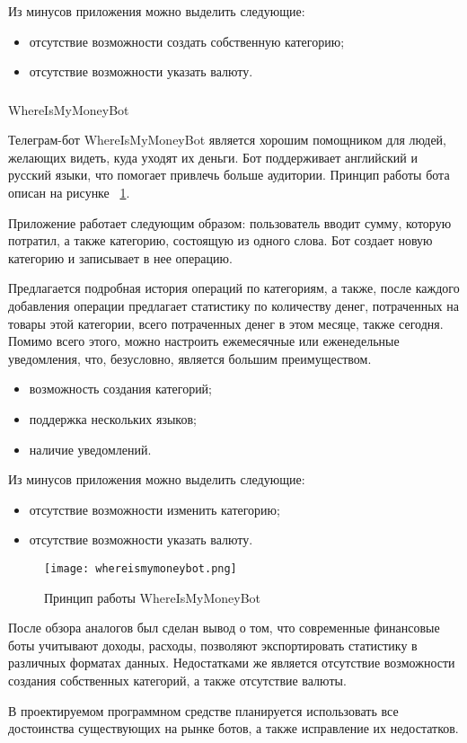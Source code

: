 Из минусов приложения можно выделить следующие:

\begin{itemize}
	\item отсутствие возможности создать собственную категорию;
	\item отсутствие возможности указать валюту.
\end{itemize}

\subsubsection{} WhereIsMyMoneyBot
\label{sec:analysis:analogues:whereismymoney}

Телеграм-бот WhereIsMyMoneyBot является хорошим помощником \linebreak для людей, желающих видеть, куда уходят их деньги. Бот поддерживает английский и русский языки, что помогает привлечь больше аудитории. Принцип работы бота описан на рисунке ~\ref{fig:analysis:analogues:whereismymoneybot}.

Приложение работает следующим образом: пользователь вводит сумму, которую потратил, а также категорию, состоящую из одного слова. Бот создает новую категорию и записывает в нее операцию.

Предлагается подробная история операций по категориям, а также, после каждого добавления операции предлагает статистику по количеству денег, потраченных на товары этой категории, всего потраченных денег в этом месяце, также сегодня. Помимо всего этого, можно настроить ежемесячные или еженедельные уведомления, что, безусловно, является большим преимуществом.

\begin{itemize}
	\item возможность создания категорий;
	\item поддержка нескольких языков;
	\item наличие уведомлений.
\end{itemize}

Из минусов приложения можно выделить следующие:

\begin{itemize}
	\item отсутствие возможности изменить категорию;
	\item отсутствие возможности указать валюту.
\end{itemize}

\begin{figure}
	\centering
	\texttt{[image: whereismymoneybot.png]} 
	\caption{Принцип работы WhereIsMyMoneyBot}
	\label{fig:analysis:analogues:whereismymoneybot}
\end{figure}

После обзора аналогов был сделан вывод о том, что современные финансовые боты учитывают доходы, расходы, позволяют экспортировать статистику в различных форматах данных. Недостатками же является отсутствие возможности создания собственных категорий, а также отсутствие валюты.

В проектируемом программном средстве планируется использовать все достоинства существующих на рынке ботов, а также исправление их недостатков.


